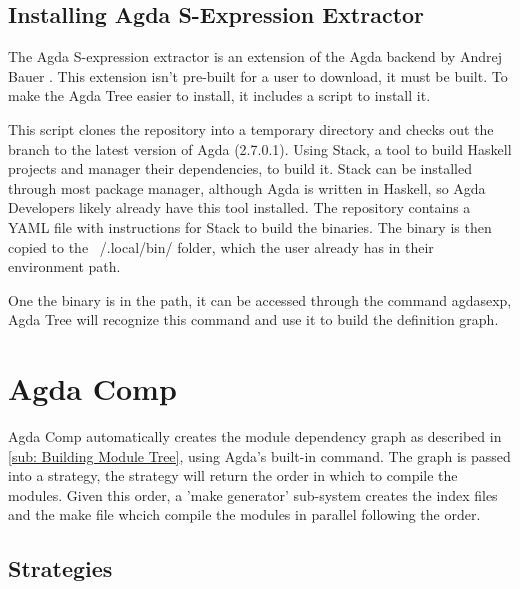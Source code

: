 \subsection{Installing Agda S-Expression Extractor}


The Agda S-expression extractor is an extension of the Agda backend by Andrej
Bauer \cite{andrej}. This extension isn't pre-built for a user to download, it
must be built. To make the Agda Tree easier to install, it includes a script to
install it.

This script clones the repository into a temporary directory and checks out the
branch to the latest version of Agda (2.7.0.1). Using Stack, a tool to build
Haskell projects and manager their dependencies, to build it. Stack can be
installed through most package manager, although Agda is written in Haskell, so
Agda Developers likely already have this tool installed. The repository
contains a YAML file with instructions for Stack to build the binaries. The
binary is then copied to the \textsf{~/.local/bin/} folder, which the user
already has in their environment path. 

One the binary is in the path, it can be accessed through the command
\textsf{agdasexp}, Agda Tree will recognize this command and use it to build
the definition graph.


\section{Agda Comp}

Agda Comp automatically creates the module dependency graph as described in
\cref{sub: Building Module Tree}, using Agda's built-in command. The graph is
passed into a strategy, the strategy will return the order in which to compile
the modules. Given this order, a 'make generator' sub-system creates the index
files and the make file whcich compile the modules in parallel following the
order.

\subsection{Strategies}

